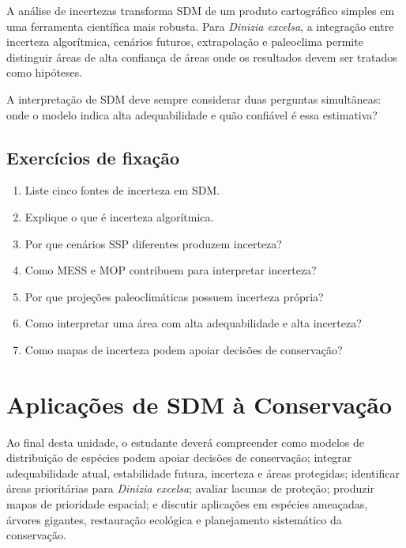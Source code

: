 \documentclass{ueap-sdm}
\begin{document}
A análise de incertezas transforma SDM de um produto cartográfico simples em uma ferramenta científica mais robusta. Para \textit{Dinizia excelsa}, a integração entre incerteza algorítmica, cenários futuros, extrapolação e paleoclima permite distinguir áreas de alta confiança de áreas onde os resultados devem ser tratados como hipóteses.

\begin{conceito}[title={\faBook\quad Mensagem central}]
	A interpretação de SDM deve sempre considerar duas perguntas simultâneas: onde o modelo indica alta adequabilidade e quão confiável é essa estimativa?
\end{conceito}

\section{Exercícios de fixação}

\begin{enumerate}
	\item Liste cinco fontes de incerteza em SDM.
	\item Explique o que é incerteza algorítmica.
	\item Por que cenários SSP diferentes produzem incerteza?
	\item Como MESS e MOP contribuem para interpretar incerteza?
	\item Por que projeções paleoclimáticas possuem incerteza própria?
	\item Como interpretar uma área com alta adequabilidade e alta incerteza?
	\item Como mapas de incerteza podem apoiar decisões de conservação?
\end{enumerate}


\chapter[Aplicações à conservação]{Aplicações de SDM à Conservação}

\begin{objetivos}
	Ao final desta unidade, o estudante deverá compreender como modelos de distribuição de espécies podem apoiar decisões de conservação; integrar adequabilidade atual, estabilidade futura, incerteza e áreas protegidas; identificar áreas prioritárias para \textit{Dinizia excelsa}; avaliar lacunas de proteção; produzir mapas de prioridade espacial; e discutir aplicações em espécies ameaçadas, árvores gigantes, restauração ecológica e planejamento sistemático da conservação.
\end{objetivos}
\end{document}
